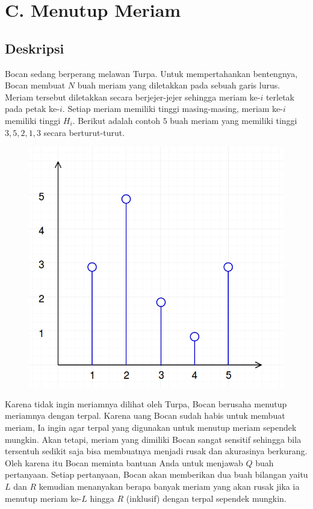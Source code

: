 \documentclass{article}
\begin{document}
\section*{\hfil C. Menutup Meriam\hfil}


\subsection*{Deskripsi}

\par\noindent Bocan sedang berperang melawan Turpa. Untuk mempertahankan bentengnya, Bocan membuat $N$ buah meriam yang diletakkan pada sebuah garis lurus. Meriam tersebut diletakkan secara berjejer-jejer sehingga meriam ke-$i$ terletak pada petak ke-$i$. Setiap meriam memiliki tinggi masing-masing, meriam ke-$i$ memiliki tinggi $H_i$. Berikut adalah contoh $5$ buah meriam yang memiliki tinggi $3, 5, 2, 1, 3$ secara berturut-turut.

\begin{figure}[h!]
	\centering
	\includegraphics[width=0.2\linewidth]{meriam1.png}
\end{figure}

\par\noindent Karena tidak ingin meriamnya dilihat oleh Turpa, Bocan berusaha menutup meriamnya dengan terpal. Karena uang Bocan sudah habis untuk membuat meriam, Ia ingin agar terpal yang digunakan untuk menutup meriam sependek mungkin. Akan tetapi, meriam yang dimiliki Bocan sangat sensitif sehingga bila tersentuh sedikit saja bisa membuatnya menjadi rusak dan akurasinya berkurang. Oleh karena itu Bocan meminta bantuan Anda untuk menjawab $Q$ buah pertanyaan. Setiap pertanyaan, Bocan akan
memberikan dua buah bilangan yaitu $L$ dan $R$ kemudian menanyakan berapa banyak meriam yang akan rusak jika ia menutup meriam ke-$L$ hingga $R$ (inklusif) dengan terpal sependek mungkin.
\end{document}
